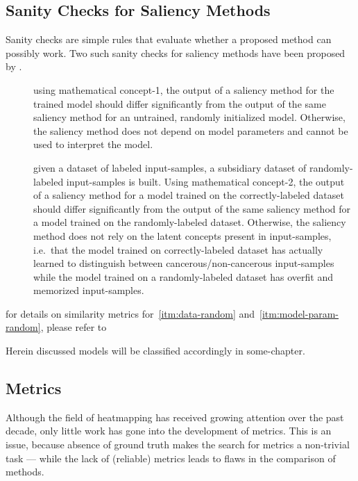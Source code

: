 \subsection{Sanity Checks for Saliency Methods}
Sanity checks are simple rules that evaluate whether a proposed method can possibly work. Two such sanity checks for saliency methods have been proposed by .

\begin{description}
    \item[]
     using mathematical concept-1, the output of a saliency method for the trained model should differ significantly from the output of the same saliency method for an untrained, randomly initialized model. Otherwise, the saliency method does not depend on model parameters and cannot be used to interpret the model.
    \item[] given a dataset of labeled input-samples, a subsidiary dataset of randomly-labeled input-samples is built. Using mathematical concept-2, the output of a saliency method for a model trained on the correctly-labeled dataset should differ significantly from the output of the same saliency method for a model trained on the randomly-labeled dataset. Otherwise, the saliency method does not rely on the latent concepts present in input-samples, i.e.\ that the model trained on correctly-labeled dataset has actually learned to distinguish between cancerous/non-cancerous input-samples while the model trained on a randomly-labeled dataset has overfit and memorized input-samples.
\end{description}
for details on similarity metrics for~\ref{itm:data-random} and~\ref{itm:model-param-random}, please refer to~\cite{Adebayo.2018}

Herein discussed models will be classified accordingly in some-chapter. 

\subsection{Metrics}
Although the field of heatmapping has received growing attention over the past decade, only little work has gone into the development of metrics. This is an issue, because absence of ground truth makes the search for metrics a non-trivial task --- while the lack of (reliable) metrics leads to flaws in the comparison of methods.

